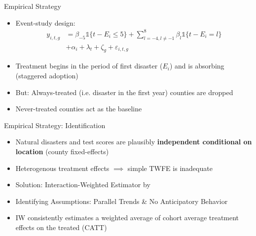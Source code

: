 \documentclass[hyperref={colorlinks = true,linkcolor = blue, citecolor=blue,urlcolor=blue}]{beamer}
\begin{document}
\begin{frame}{Empirical Strategy}
	\begin{itemize}
		\item Event-study design:
		\begin{align*}
			y_{i, t, g} &= \beta_{-5}  \mathds{1}\{t - E_i \leq 5\} + \sum_{l = -4, l \neq -1}^{8} \beta_l \mathds{1}\{t - E_i = l\} \\ &+ \alpha_i + \lambda_t + \zeta_g + \varepsilon_{i, t, g}
		\end{align*}
		\item Treatment begins in the period of first disaster ($E_i$) and is absorbing (staggered adoption)
		\item But: Always-treated (i.e. disaster in the first year) counties are dropped
		\item Never-treated counties act as the baseline
	\end{itemize}
\end{frame}

\begin{frame}{Empirical Strategy: Identification}
	\begin{itemize}
		\item Natural disasters and test scores are plausibly \textbf{independent conditional on location} (county fixed-effects)
		\item Heterogenous treatment effects $\implies$ simple TWFE is inadequate \citep{deChaisemartin_2020, Sun_2021}
		\item Solution: Interaction-Weighted Estimator by \cite{Sun_2021}
		\item Identifying Assumptions: Parallel Trends \& No Anticipatory Behavior
		\item IW consistently estimates a weighted average of cohort average treatment effects on the treated (CATT)
	\end{itemize}
\end{frame}
\end{document}
